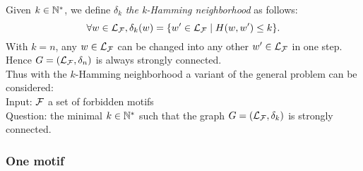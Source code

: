 \documentclass{article}
\begin{document}
	Given $k \in \mathbb{N}^*$, we define $\delta_k$ {\it the k-Hamming neighborhood} as follows:
	$$\forall w \in \mathcal{L}_{\mathcal{F}},  \delta_k(w) = \{w'\in \mathcal{L}_{\mathcal{F}} \mid H(w,w')\le k\}. $$
	With $k = n$, any $w \in \mathcal{L}_{\mathcal{F}}$ can be changed into any other $w' \in \mathcal{L}_{\mathcal{F}}$ in one step. Hence $G = (\mathcal{L}_{\mathcal{F}}, \delta_n)$ is always strongly connected. \\
	Thus with the $k$-Hamming neighborhood a variant of the general problem can be considered: \\
	\newline
	Input: $\mathcal{F}$ a set of forbidden motifs \\
	Question: the minimal $k \in \mathbb{N}^*$ such that the graph $G = (\mathcal{L}_{\mathcal{F}}, \delta_k)$ is strongly connected.
	
	
	\subsubsection{One motif}
	
\end{document}
